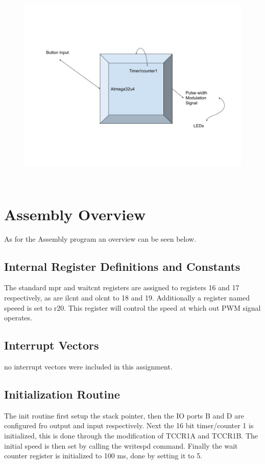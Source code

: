 \documentclass[12pt,letterpaper]{article}
\begin{document}
\begin{figure}[h]
	\includegraphics[width=12cm, height=10cm]{Block Diagram L6.jpg}
	\centering
\end{figure}
	
\section{Assembly Overview}
As for the Assembly program an overview can be seen below. 

\subsection{Internal Register Definitions and Constants}
The standard mpr and waitcnt registers are assigned to registers 16 and 17 respectively, as are ilcnt and olcnt to 18 and 19. Additionally a register named speeed is set to r20. This register will control the speed at which out PWM signal operates.

\subsection{Interrupt Vectors}
no interrupt vectors were included in this assignment. 
\subsection{Initialization Routine}
The init routine first setup the stack pointer, then the IO ports B and D are configured fro output and input respectively. Next the 16 bit timer/counter 1 is initialized, this is done through the modification of TCCR1A and TCCR1B. The initial speed is then set by calling the writespd command. Finally the wait counter register is initialized to 100 ms, done by setting it to 5.
\end{document}
